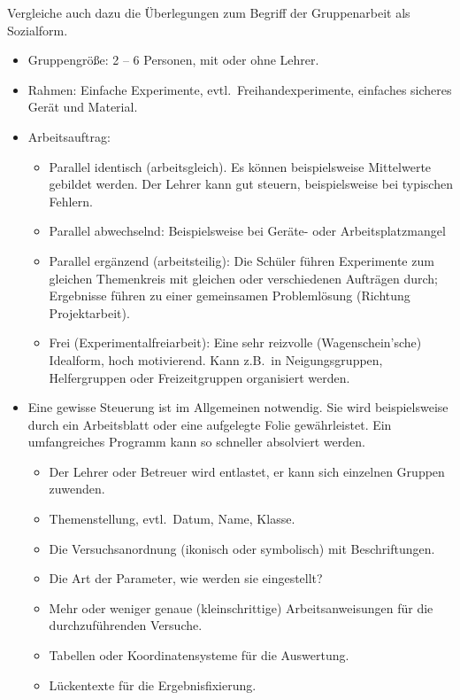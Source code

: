 Vergleiche auch dazu die \"{U}berlegungen zum Begriff der
Gruppenarbeit als Sozialform.

\begin{itemize}
	\item
	Gruppengr\"{o}{\ss}e: 2 -- 6 Personen, mit oder ohne Lehrer.
	
	\item
	Rahmen: Einfache Experimente, evtl.\ Freihandexperimente,
	einfaches sicheres Ger\"{a}t und Material.
	\item
	Arbeitsauftrag:
	\begin{itemize}
		\item
		Parallel identisch (arbeitsgleich).
		Es k\"{o}nnen beispielsweise Mittelwerte gebildet werden.
		Der Lehrer kann gut steuern, beispielsweise bei typischen Fehlern.
		\item
		Parallel abwechselnd:
		Beispielsweise bei Ger\"{a}te- oder Arbeitsplatzmangel
		\item
		Parallel erg\"{a}nzend (arbeitsteilig):
		Die Sch\"{u}ler f\"{u}hren Experimente zum gleichen Themenkreis mit
		gleichen oder verschiedenen Auftr\"{a}gen durch;
		Ergebnisse f\"{u}hren zu einer gemeinsamen Probleml\"{o}sung
		(Richtung Projektarbeit).
		\item
		Frei (Experimentalfreiarbeit):
		Eine sehr reizvolle (Wagenschein'sche) Idealform, hoch motivierend.
		Kann z.B.\ in Neigungsgruppen, Helfergruppen oder
		Freizeitgruppen organisiert werden.
	
	\end{itemize}
	
	\item
	Eine gewisse Steuerung ist im Allgemeinen notwendig.
	Sie wird beispielsweise durch ein Arbeitsblatt oder eine
	aufgelegte Folie gew\"{a}hrleistet.
	Ein umfangreiches Programm kann so schneller absolviert werden.
	
	
	\begin{itemize}
		\item
		Der Lehrer oder Betreuer wird entlastet, er kann sich
		einzelnen Gruppen zuwenden.
		\item
		Themenstellung, evtl.\ Datum, Name, Klasse.
		\item
		Die Versuchsanordnung (ikonisch oder symbolisch)
		mit Beschriftungen.
		\item
		Die Art der Parameter, wie werden sie eingestellt?
		\item
		Mehr oder weniger genaue (kleinschrittige) Arbeitsanweisungen
		f\"{u}r die durchzuf\"{u}hrenden Versuche.
		\item
		Tabellen oder Koordinatensysteme f\"{u}r die Auswertung.
		\item
		L\"{u}ckentexte f\"{u}r die Ergebnisfixierung.
	

\end{itemize}
\end{itemize}
